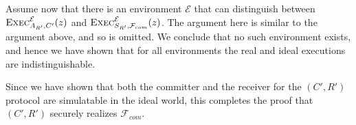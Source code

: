 \documentclass[draft]{article}
\begin{document}
\begin{enumerate}
\begin{enumerate}
\begin{description}
      Assume now that there is an environment $\mathcal{E}$ that can distinguish between $\textsc{Exec}^\mathcal{E}_{A_{R'}, C'}(z)$ and $\textsc{Exec}^{\mathcal{E}}_{S_{R'}, \mathcal{F}_{com}}(z)$.
      The argument here is similar to the argument above, and so is omitted.
      We conclude that no such environment exists, and hence we have shown that for all environments the real and ideal executions are indistinguishable.
    \end{description}
    Since we have shown that both the committer and the receiver for the $(C', R')$ protocol are simulatable in the ideal world, this completes the proof that $(C', R')$ securely realizes $\mathcal{F}_{com}$.
  \end{enumerate}
\end{enumerate}
\end{document}
